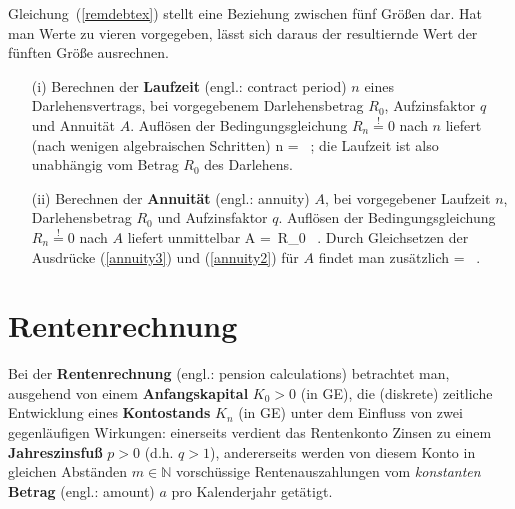\medskip
\noindent
Gleichung~(\ref{remdebtex}) stellt eine Beziehung zwischen
f\"unf Gr\"o\ss en dar. Hat man Werte zu vieren vorgegeben,
l\"asst sich daraus der resultiernde Wert der f\"unften
Gr\"o\ss e ausrechnen.
%
\begin{itemize}
\item[(i)] Berechnen der {\bf Laufzeit} (engl.: contract period) 
$n$ eines Darlehensvertrags, bei vorgegebenem Darlehensbetrag 
$R_{0}$, Aufzinsfaktor $q$ und Annuit\"at $A$. Aufl\"osen der
Bedingungsgleichung $R_{n}\stackrel{!}{=}0$ nach $n$
liefert (nach wenigen algebraischen Schritten)
%
\be
n =  \ ;
\ee
%
die Laufzeit ist also unabh\"angig vom Betrag $R_{0}$ des Darlehens.

\item[(ii)] Berechnen der {\bf Annuit\"at} (engl.: annuity) $A$,
bei vorgegebener Laufzeit $n$, Darlehensbetrag $R_{0}$
und Aufzinsfaktor $q$. Aufl\"osen der Bedingungsgleichung
$R_{n}\stackrel{!}{=}0$ nach $A$ liefert unmittelbar
%
\be
{}
A = \,R_{0} \ .
\ee
%
Durch Gleichsetzen der Ausdr\"ucke (\ref{annuity3}) und
(\ref{annuity2}) f\"ur $A$ findet man zus\"atzlich
%
\be
{} =  \ .
\ee
%
\end{itemize}
%

\section[Rentenrechnung]{Rentenrechnung}
Bei der {\bf Rentenrechnung} (engl.: pension calculations) 
betrachtet man, ausgehend von einem {\bf Anfangskapital} $K_{0}>0$ 
(in GE), die (diskrete) zeitliche
Entwicklung eines {\bf Kontostands} $K_{n}$ (in GE) unter dem
Einfluss von zwei gegenl\"aufigen Wirkungen: einerseits verdient
das Rentenkonto Zinsen zu einem {\bf Jahreszinsfu\ss} $p>0$
(d.h. $q>1$), andererseits werden von diesem Konto in gleichen
Abst\"anden $m \in \mathbb{N}$ vorsch\"ussige Rentenauszahlungen
vom {\em konstanten\/} {\bf Betrag} (engl.: amount) $a$ pro 
Kalenderjahr get\"atigt.

